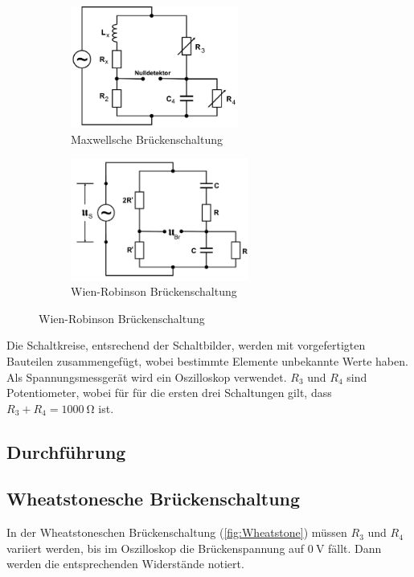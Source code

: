 \begin{figure}
    \begin{subfigure}{0.5\textwidth}
        \centering
        \includegraphics[height=4cm]{Bilder/Maxwell}
        \caption{Maxwellsche Brückenschaltung}
        \label{fig:Maxwell}
    \end{subfigure}
    \begin{subfigure}{0.5\textwidth}
        \centering
        \includegraphics[height=4cm]{Bilder/Wien-Robinson}
        \caption{Wien-Robinson Brückenschaltung}
        \label{fig:Wien}
    \end{subfigure}
    \centering
\end{figure}
\cite{v302}


\noindent Die Schaltkreise, entsrechend der Schaltbilder, werden
mit vorgefertigten Bauteilen zusammengefügt, wobei bestimmte Elemente unbekannte Werte haben.
Als Spannungsmessgerät wird ein Oszilloskop verwendet. $R_3$ und $R_4$ sind Potentiometer, wobei für
für die ersten drei Schaltungen gilt, dass $R_3+R_4=\qty{1000}{\ohm}$ ist.

\subsection{Durchführung}

\subsection{Wheatstonesche Brückenschaltung}
In der Wheatstoneschen Brückenschaltung (\ref{fig:Wheatstone}) müssen $R_3$ und $R_4$ variiert werden, 
bis im Oszilloskop die Brückenspannung auf $\qty{0}{\volt}$ fällt. Dann werden die entsprechenden Widerstände
notiert.

